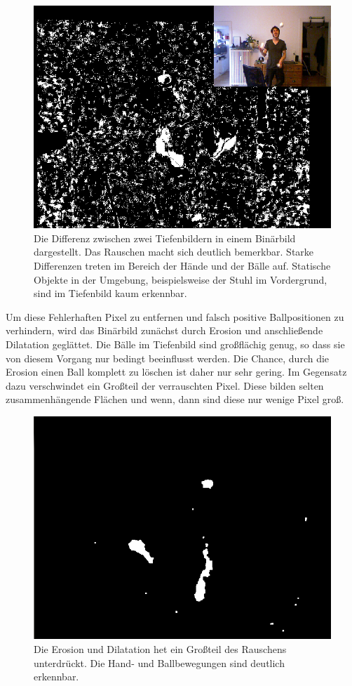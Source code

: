 \documentclass[12pt,a4paper,ngerman]{scrartcl}
\begin{document}
\begin{figure}[H]
    \centering
    \includegraphics[scale=0.7]{img/temporal_scene.png}
    \caption{Die Differenz zwischen zwei Tiefenbildern in einem Binärbild dargestellt. Das Rauschen macht sich deutlich bemerkbar. Starke Differenzen treten im Bereich der Hände und der Bälle auf. Statische Objekte in der Umgebung, beispielsweise der Stuhl im Vordergrund, sind im Tiefenbild kaum erkennbar.}
    \label{temporal_rauschen}
\end{figure}

Um diese Fehlerhaften Pixel zu entfernen und falsch positive Ballpositionen zu verhindern, wird das Binärbild zunächst durch Erosion und anschließende Dilatation geglättet.
Die Bälle im Tiefenbild sind großflächig genug, so dass sie von diesem Vorgang nur bedingt beeinflusst werden.
Die Chance, durch die Erosion einen Ball komplett zu löschen ist daher nur sehr gering.
Im Gegensatz dazu verschwindet ein Großteil der verrauschten Pixel.
Diese bilden selten zusammenhängende Flächen und wenn, dann sind diese nur wenige Pixel groß.

\begin{figure}[H]
    \centering
    \includegraphics[scale=0.7]{img/rauschfrei.png}
    \caption{Die Erosion und Dilatation het ein Großteil des Rauschens unterdrückt. Die Hand- und Ballbewegungen sind deutlich erkennbar.}
    \label{temporal_rauschfrei}
\end{figure}
\end{document}
